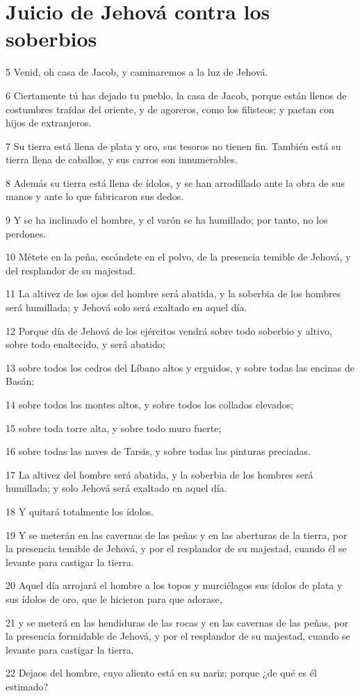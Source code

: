 \section*{Juicio de Jehová contra los soberbios}

\par 5 Venid, oh casa de Jacob, y caminaremos a la luz de Jehová.
\par 6 Ciertamente tú has dejado tu pueblo, la casa de Jacob, porque están llenos de costumbres traídas del oriente, y de agoreros, como los filisteos; y pactan con hijos de extranjeros.
\par 7 Su tierra está llena de plata y oro, sus tesoros no tienen fin. También está su tierra llena de caballos, y sus carros son innumerables.
\par 8 Además su tierra está llena de ídolos, y se han arrodillado ante la obra de sus manos y ante lo que fabricaron sus dedos.
\par 9 Y se ha inclinado el hombre, y el varón se ha humillado; por tanto, no los perdones.
\par 10 Métete en la peña, escóndete en el polvo, de la presencia temible de Jehová, y del resplandor de su majestad.
\par 11 La altivez de los ojos del hombre será abatida, y la soberbia de los hombres será humillada; y Jehová solo será exaltado en aquel día.
\par 12 Porque día de Jehová de los ejércitos vendrá sobre todo soberbio y altivo, sobre todo enaltecido, y será abatido;
\par 13 sobre todos los cedros del Líbano altos y erguidos, y sobre todas las encinas de Basán;
\par 14 sobre todos los montes altos, y sobre todos los collados elevados;
\par 15 sobre toda torre alta, y sobre todo muro fuerte;
\par 16 sobre todas las naves de Tarsis, y sobre todas las pinturas preciadas.
\par 17 La altivez del hombre será abatida, y la soberbia de los hombres será humillada; y solo Jehová será exaltado en aquel día.
\par 18 Y quitará totalmente los ídolos.
\par 19 Y se meterán en las cavernas de las peñas y en las aberturas de la tierra, por la presencia temible de Jehová, y por el resplandor de su majestad, cuando él se levante para castigar la tierra.
\par 20 Aquel día arrojará el hombre a los topos y murciélagos sus ídolos de plata y sus ídolos de oro, que le hicieron para que adorase,
\par 21 y se meterá en las hendiduras de las rocas y en las cavernas de las peñas, por la presencia formidable de Jehová, y por el resplandor de su majestad, cuando se levante para castigar la tierra.
\par 22 Dejaos del hombre, cuyo aliento está en su nariz; porque ¿de qué es él estimado?

